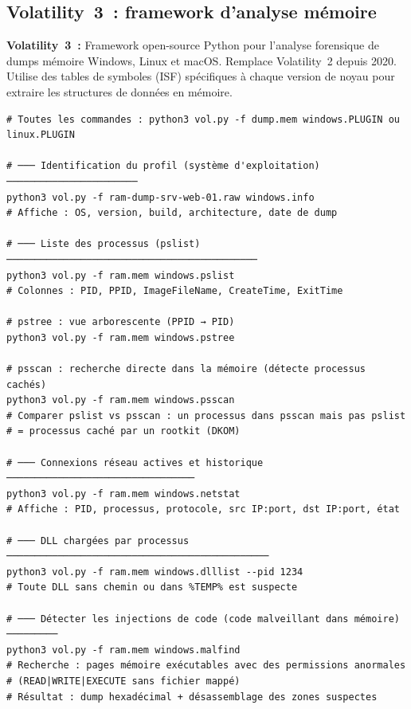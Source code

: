 \subsection{Volatility~3~: framework d'analyse mémoire}

\begin{boxdef}
\textbf{Volatility~3~:} Framework open-source Python pour l'analyse
forensique de dumps mémoire Windows, Linux et macOS. Remplace Volatility~2
depuis 2020. Utilise des tables de symboles (ISF) spécifiques à chaque
version de noyau pour extraire les structures de données en mémoire.
\end{boxdef}

\begin{lstlisting}[style=StyleTerminal,
  caption={Commandes Volatility~3 essentielles pour l'investigation},
  label={lst:volatility3}]
# Toutes les commandes : python3 vol.py -f dump.mem windows.PLUGIN ou linux.PLUGIN

# ─── Identification du profil (système d'exploitation) ───────────────────────
python3 vol.py -f ram-dump-srv-web-01.raw windows.info
# Affiche : OS, version, build, architecture, date de dump

# ─── Liste des processus (pslist) ────────────────────────────────────────────
python3 vol.py -f ram.mem windows.pslist
# Colonnes : PID, PPID, ImageFileName, CreateTime, ExitTime

# pstree : vue arborescente (PPID → PID)
python3 vol.py -f ram.mem windows.pstree

# psscan : recherche directe dans la mémoire (détecte processus cachés)
python3 vol.py -f ram.mem windows.psscan
# Comparer pslist vs psscan : un processus dans psscan mais pas pslist
# = processus caché par un rootkit (DKOM)

# ─── Connexions réseau actives et historique ─────────────────────────────────
python3 vol.py -f ram.mem windows.netstat
# Affiche : PID, processus, protocole, src IP:port, dst IP:port, état

# ─── DLL chargées par processus ──────────────────────────────────────────────
python3 vol.py -f ram.mem windows.dlllist --pid 1234
# Toute DLL sans chemin ou dans %TEMP% est suspecte

# ─── Détecter les injections de code (code malveillant dans mémoire) ─────────
python3 vol.py -f ram.mem windows.malfind
# Recherche : pages mémoire exécutables avec des permissions anormales
# (READ|WRITE|EXECUTE sans fichier mappé)
# Résultat : dump hexadécimal + désassemblage des zones suspectes


\end{lstlisting}
